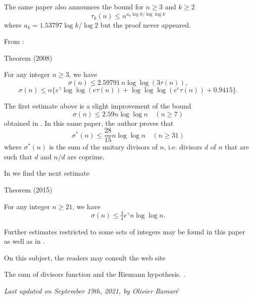 The same paper also announces the bound for $n\ge3$ and $k\ge2$
$$
\tau_k(n)\le n^{a_k\log k/\log\log k}
$$
where $a_k=1.53797\log k / \log 2$ but the proof never appeared.

From \cite{Nicolas*08}:

\begin{thm}{Theorem (2008)}

For any integer $n\ge3$, we have
  $$\sigma(n)\le 2.59791\, n\log\log(3\tau(n)),$$
  $$\sigma(n)\le n\{ e^\gamma\log\log(e\tau(n))+\log\log\log(e^e\tau(n))+0.9415\}.$$
\end{thm}


The first estimate above is a slight improvement of the bound
  $$\sigma(n)\le 2.59 n\log\log n\quad(n\ge7)$$
obtained in
\cite{Ivic*77}.
In this same paper,
  the author proves that
$$\sigma^*(n)\le \frac{28}{15} n\log\log n\quad(n\ge31)$$
where $\sigma^*(n)$ is the sum of the unitary divisors of $n$, i.e. divisors
  $d$ of $n$ that are such that $d$ and $n/d$ are coprime.

\par 
In
\cite{Eum-Koo*15}
we find the next estimate
\begin{thm}{Theorem (2015)}

For any integer $n\ge21$, we have
  $$\sigma(n)\le \tfrac34e^\gamma n\log\log n.$$
\end{thm}


Further estimates restricted to some sets of integers may be found in
this paper as well as in
\cite{Washington-Yang*21}.

\par 
\par 
On this subject, the readers may consult the web site

The sum of divisors function and the
Riemann hypothesis.
.





  
\begin{flushright}\small\sl{}   Last updated on September 19th, 2021, by Olivier Ramar\'e
 \end{flushright}














